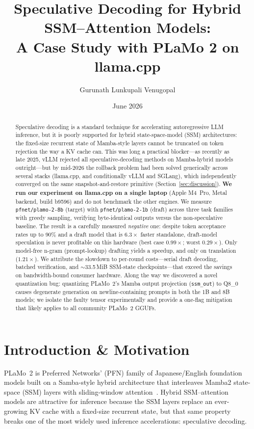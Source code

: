 \documentclass[10pt]{article}
\title{Speculative Decoding for Hybrid SSM--Attention Models:\\
A Case Study with PLaMo 2 on llama.cpp}
\author{Gurunath Lunkupali Venugopal}
\date{June 2026}
\newcommand{\code}[1]{\texttt{#1}}
\begin{document}
\maketitle

\begin{abstract}
Speculative decoding is a standard technique for accelerating autoregressive
LLM inference, but it is poorly supported for hybrid state-space-model (SSM)
architectures: the fixed-size recurrent state of Mamba-style layers cannot be
truncated on token rejection the way a KV cache can. This was long a
practical blocker---as recently as late 2025, vLLM rejected all
speculative-decoding methods on Mamba-hybrid models outright---but by mid-2026
the rollback problem had been solved generically across several stacks
(llama.cpp, and conditionally vLLM and SGLang), which independently converged
on the same snapshot-and-restore primitive (Section~\ref{sec:discussion}).
\textbf{We run our experiment on llama.cpp on a single laptop} (Apple
M4~Pro, Metal backend, build b9596) and do not benchmark the other engines.
We measure \code{pfnet/plamo-2-8b} (target) with \code{pfnet/plamo-2-1b}
(draft) across three task families with greedy sampling, verifying
byte-identical outputs versus the non-speculative baseline. The result is a carefully measured
\emph{negative} one: despite token acceptance rates up to 90\% and a draft
model that is $6.3\times$ faster standalone, draft-model speculation is
never profitable on this hardware (best case $0.99\times$; worst
$0.29\times$). Only model-free n-gram (prompt-lookup) drafting yields a
speedup, and only on translation ($1.21\times$). We attribute the slowdown
to per-round costs---serial draft decoding, batched verification, and
$\sim$33.5\,MiB SSM-state checkpoints---that exceed the savings on
bandwidth-bound consumer hardware. Along the way we discovered a novel
quantization bug: quantizing PLaMo~2's Mamba output projection
(\code{ssm\_out}) to Q8\_0 causes degenerate generation on
newline-containing prompts in both the 1B and 8B models; we isolate the
faulty tensor experimentally and provide a one-flag mitigation that likely
applies to all community PLaMo~2 GGUFs.
\end{abstract}

\section{Introduction \& Motivation}

PLaMo~2 is Preferred Networks' (PFN) family of Japanese/English foundation
models built on a Samba-style hybrid architecture that interleaves Mamba2
state-space (SSM) layers with sliding-window attention~\cite{plamo2tr}. Hybrid
SSM--attention models are attractive for inference because the SSM layers
replace an ever-growing KV cache with a fixed-size recurrent state, but that
same property breaks one of the most widely used inference accelerations:
speculative decoding.
\end{document}
